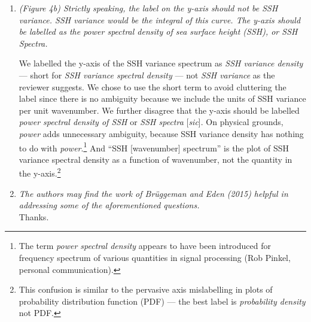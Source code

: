 \documentclass[11pt]{article}
\newcommand{\bdp}{\begin{description}}
\newcommand{\edp}{\end{description}}
\begin{document}
\begin{enumerate}
\item {\it (Figure 4b) Strictly speaking, the label on the y-axis should not be SSH variance. SSH
      variance would be the integral of this curve. The y-axis should be labelled as the
      power spectral density of sea surface height (SSH), or SSH Spectra.}\\

      \bdp
      We labelled the y-axis of the SSH variance spectrum as \textit{SSH variance density}
      --- short for \textit{SSH variance spectral density} --- not \textit{SSH variance} as the reviewer
      suggests.  We chose to use the short term to avoid cluttering the label
      since there is no ambiguity because we include the
      units of SSH variance per unit wavenumber.
      We further disagree that the y-axis should be labelled \textit{power spectral density of SSH}
      or \textit{SSH spectra} [{\it sic}]. On physical grounds, \textit{power} adds
      unnecessary ambiguity,
      because SSH variance density has nothing to do with \textit{power}.\footnote{The
      term \textit{power spectral density}  appears to have been introduced
      for frequency spectrum of various quantities in signal processing (Rob Pinkel, personal
      communication).}
      And ``SSH [wavenumber] spectrum'' is the plot of SSH variance spectral density
      as a function of wavenumber, not the quantity in the y-axis.\footnote{This confusion is similar
      to the pervasive axis mislabelling in plots of probability distribution function (PDF)
      --- the best label is \textit{probability density} not PDF.}
      \edp



\item {\it The authors may find the work of Brüggeman and Eden (2015) helpful in addressing
      some of the aforementioned questions.}\\

      Thanks.


\end{enumerate}
\end{document}
